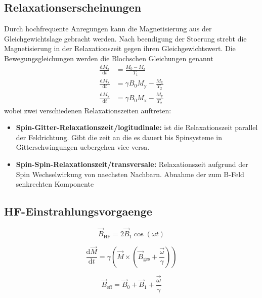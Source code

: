 \subsection{Relaxationserscheinungen}%
\label{sub:relaxationserscheinungen}
Durch hochfrequente Anregungen kann die Magnetisierung aus der
Gleichgewichtslage gebracht werden.
Nach beendigung der Stoerung strebt die Magnetisierung in der Relaxationszeit
gegen ihren Gleichgewichtswert. 
Die Bewegungsgleichungen werden die Blochschen Gleichungen genannt
\begin{align}
		\frac{\text{d} M_\text{z}}{\text{d} t} &= \frac{M_0 - M_\text{z}}{T_1} \\
		\frac{\text{d} M_\text{x}}{\text{d} t} &= \gamma B_0 M_\text{y} -
		\frac{M_\text{x}}{T_2} \\               
		\frac{\text{d} M_\text{y}}{\text{d} t} &= \gamma B_0 M_\text{x} - \frac{M_\text{y}}{T_2} 
\end{align}
wobei zwei verschiedenen Relaxationszeiten auftreten:
\begin{itemize}
		\item \textbf{Spin-Gitter-Relaxationszeit/logitudinale:}
				ist die Relaxationszeit parallel der Feldrichtung. Gibt die zeit
				an die es dauert bis Spinsysteme in Gitterschwingungen
				uebergehen vice versa. 
		\item \textbf{Spin-Spin-Relaxationszeit/transversale:} Relaxationszeit
				aufgrund der Spin Wechselwirkung von naechsten Nachbarn. Abnahme
				der zum B-Feld senkrechten Komponente
\end{itemize}

\subsection{HF-Einstrahlungsvorgaenge}%
\label{sub:hf_einstrahlungsvorgaenge}

\begin{equation}
		\label{eq:bhf}
		\vec{B}_\text{HF} = 2 \vec{B}_1 \cos(\omega t)
\end{equation}

\begin{equation}
		\label{eq:moment}
		\frac{\text{d}\vec{M}}{\text{d} t} = \gamma \left( \vec{M} \times \left(
		\vec{B}_\text{ges} + \frac{\vec{\omega}}{\gamma} \right) \right)
\end{equation}

\begin{equation}
		\label{eq:sumB}
		\vec{B}_\text{eff} = \vec{B}_0 + \vec{B}_1 + \frac{\vec{\omega}}{\gamma}
\end{equation}

